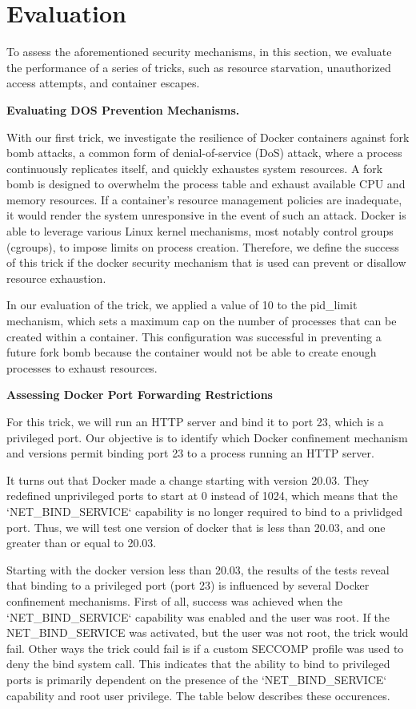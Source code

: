 
\section{Evaluation}
\label{sec:evaluation}

To assess the aforementioned security mechanisms, in this section, we evaluate the performance of a series of tricks, such as resource starvation, unauthorized access attempts, and container escapes.

\noindent\textbf{Evaluating DOS Prevention Mechanisms.}

With our first trick, we investigate the resilience of Docker containers against fork bomb attacks, a common form of denial-of-service (DoS) attack, where a process continuously replicates itself, and quickly exhaustes system resources. A fork bomb is designed to overwhelm the process table and exhaust available CPU and memory resources. If a container's resource management policies are inadequate, it would render the system unresponsive in the event of such an attack. Docker is able to leverage various Linux kernel mechanisms, most notably control groups (cgroups), to impose limits on process creation. Therefore, we define the success of this trick if the docker security mechanism that is used can prevent or disallow resource exhaustion. 

In our evaluation of the trick, we applied a value of 10 to the pid\_limit mechanism, which sets a maximum cap on the number of processes that can be created within a container. This configuration was successful in preventing a future fork bomb because the container would not be able to create enough processes to exhaust resources.

\noindent\textbf{Assessing Docker Port Forwarding Restrictions}

For this trick, we will run an HTTP server and bind it to port 23, which is a privileged port. Our objective is to identify which Docker confinement mechanism and versions permit binding port 23 to a process running an HTTP server.

It turns out that Docker made a change starting with version 20.03. They redefined unprivileged ports to start at 0 instead of 1024, which means that the `NET\_BIND\_SERVICE` capability is no longer required to bind to a privlidged port. Thus, we will test one version of docker that is less than 20.03, and one greater than or equal to 20.03.

Starting with the docker version less than 20.03, the results of the tests reveal that binding to a privileged port (port 23) is influenced by several Docker confinement mechanisms. First of all, success was achieved when the `NET\_BIND\_SERVICE` capability was enabled and the user was root. If the NET\_BIND\_SERVICE was activated, but the user was not root, the trick would fail. Other ways the trick could fail is if a custom SECCOMP profile was used to deny the bind system call. This indicates that the ability to bind to privileged ports is primarily dependent on the presence of the `NET\_BIND\_SERVICE` capability and root user privilege. The table below describes these occurences.


